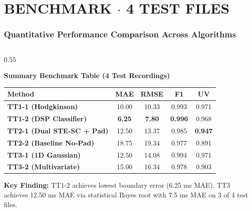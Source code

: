 \documentclass[aspectratio=169, 10pt]{beamer}
\begin{document}
\section{BENCHMARK $\cdot$ 4 TEST FILES}
\begin{frame}
  \frametitle{Quantitative Performance Comparison Across Algorithms}
  \begin{tcolorbox}[contentframe]
  \begin{columns}[c]
    \begin{column}{0.55\textwidth}
      \begin{tcolorbox}[darkcard, height=2.95cm, valign=top, top=3pt, bottom=3pt]
        \centering
        {\fontsize{8pt}{9.5pt}\selectfont\color{cyanGlow}\textbf{Summary Benchmark Table (4 Test Recordings)}}\\[3pt]
        \fontsize{6.8pt}{8.2pt}\selectfont
        \setlength{\tabcolsep}{3pt}
        \begin{tabularx}{\linewidth}{>{\raggedright\arraybackslash}Xcccc}
          \toprule
          \textbf{Method} & \textbf{MAE} & \textbf{RMSE} & \textbf{F1} & \textbf{UV} \\
          \midrule
          \textbf{TT1-1 (Hodgkinson)} & 10.00 & 10.33 & 0.993 & 0.971 \\
          \textbf{TT1-2 (DSP Classifier)} & \textbf{6.25} & \textbf{7.80} & \textbf{0.996} & 0.968 \\
          \midrule
          \textbf{TT2-1 (Dual STE-SC + Pad)} & 12.50 & 13.37 & 0.985 & \textbf{0.947} \\
          \textbf{TT2-2 (Baseline No-Pad)} & 18.75 & 19.34 & 0.977 & 0.891 \\
          \midrule
          \textbf{TT3-1 (1D Gaussian)} & 12.50 & 14.08 & 0.994 & 0.971 \\
          \textbf{TT3-2 (Multivariate)} & 15.00 & 16.34 & 0.978 & 0.903 \\
          \bottomrule
        \end{tabularx}
      \end{tcolorbox}
      \vskip0.15cm
      \begin{tcolorbox}[mintcard, height=1.55cm, valign=top, top=3pt, bottom=3pt]
        {\fontsize{7.2pt}{8.6pt}\selectfont\color{mintGreen}\textbf{Key Finding:} TT1-2 achieves lowest boundary error (6.25 ms MAE). TT3 achieves 12.50 ms MAE via statistical Bayes root with 7.5 ms MAE on 3 of 4 test files.}
      \end{tcolorbox}
    \end{column}


\end{columns}
\end{tcolorbox}
\end{frame}
\end{document}
